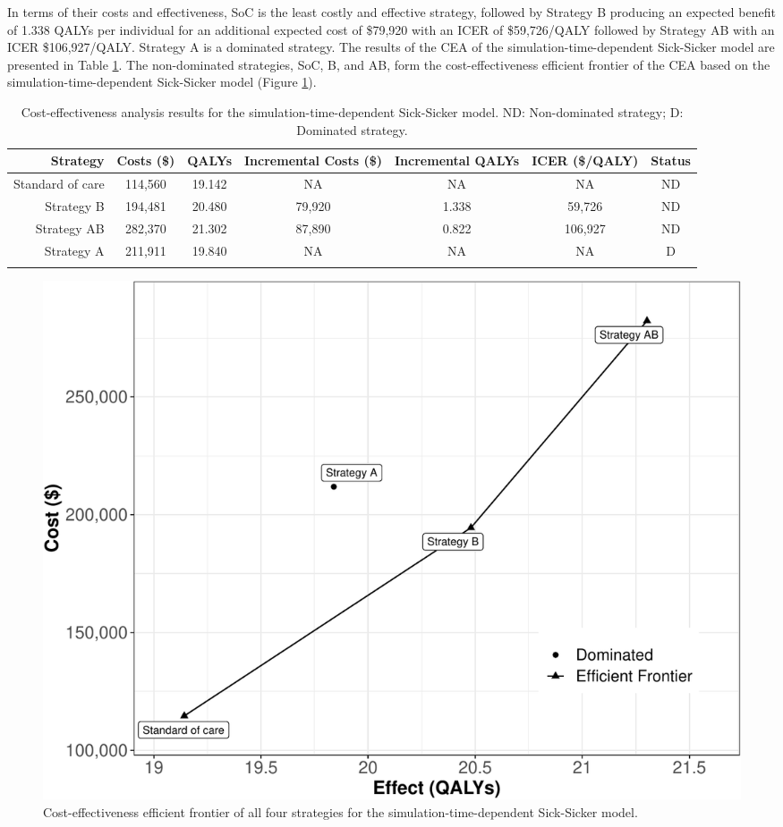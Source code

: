 \documentclass[
]{article}
\begin{document}
In terms of their costs and effectiveness, SoC is the least costly and effective strategy, followed by Strategy B producing an expected benefit of 1.338 QALYs per individual for an additional expected cost of \$79,920 with an ICER of \$59,726/QALY followed by Strategy AB with an ICER \$106,927/QALY. Strategy A is a dominated strategy. The results of the CEA of the simulation-time-dependent Sick-Sicker model are presented in Table \ref{tab:table-cea}. The non-dominated strategies, SoC, B, and AB, form the cost-effectiveness efficient frontier of the CEA based on the simulation-time-dependent Sick-Sicker model (Figure \ref{fig:Sick-Sicker-CEA-AgeDep}).

\begin{table}[!h]

\caption{\label{tab:table-cea}Cost-effectiveness analysis results for the simulation-time-dependent Sick-Sicker model. ND: Non-dominated strategy; D: Dominated strategy.}
\centering
\begin{tabular}[t]{rcccccc}
\toprule{}
Strategy & Costs (\$) & QALYs & Incremental Costs (\$) & Incremental QALYs & ICER (\$/QALY) & Status\\
\midrule{}
Standard of care & 114,560 & 19.142 & NA & NA & NA & ND\\
Strategy B & 194,481 & 20.480 & 79,920 & 1.338 & 59,726 & ND\\
Strategy AB & 282,370 & 21.302 & 87,890 & 0.822 & 106,927 & ND\\
Strategy A & 211,911 & 19.840 & NA & NA & NA & D\\
\bottomrule{}
\end{tabular}
\end{table}

\begin{figure}[H]

{\centering \includegraphics{figs/Sick-Sicker-CEA-AgeDep-1} 

}

\caption{Cost-effectiveness efficient frontier of all four strategies for the simulation-time-dependent Sick-Sicker model.}\label{fig:Sick-Sicker-CEA-AgeDep}
\end{figure}
\end{document}
